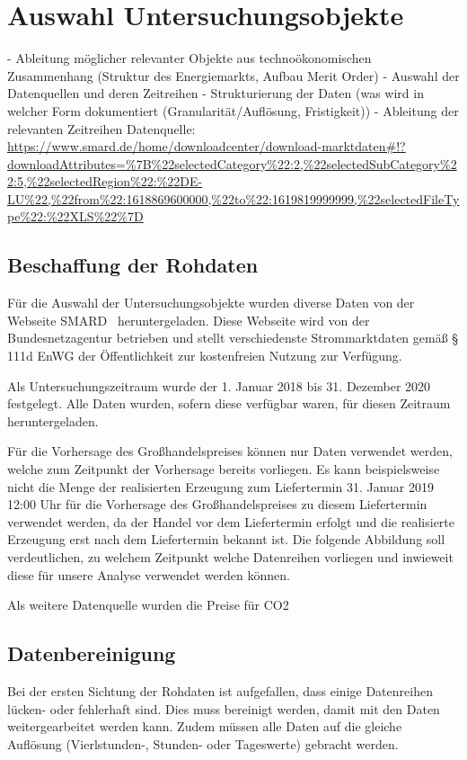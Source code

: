 \section{Auswahl Untersuchungsobjekte}
-	Ableitung möglicher relevanter Objekte aus technoökonomischen Zusammenhang (Struktur des Energiemarkts, Aufbau Merit Order)
-	Auswahl der Datenquellen und deren Zeitreihen
-	Strukturierung der Daten (was wird in welcher Form dokumentiert (Granularität/Auflösung, Fristigkeit))
-	Ableitung der relevanten Zeitreihen
Datenquelle: \url{https://www.smard.de/home/downloadcenter/download-marktdaten#!?downloadAttributes=%7B%22selectedCategory%22:2,%22selectedSubCategory%22:5,%22selectedRegion%22:%22DE-LU%22,%22from%22:1618869600000,%22to%22:1619819999999,%22selectedFileType%22:%22XLS%22%7D}

\subsection{Beschaffung der Rohdaten}
Für die Auswahl der Untersuchungsobjekte wurden diverse Daten von der Webseite SMARD  heruntergeladen. Diese Webseite wird von der Bundesnetzagentur betrieben und stellt verschiedenste Strommarktdaten gemäß § 111d EnWG  der Öffentlichkeit zur kostenfreien Nutzung zur Verfügung.


Als Untersuchungszeitraum wurde der 1. Januar 2018 bis 31. Dezember 2020 festgelegt. Alle Daten wurden, sofern diese verfügbar waren, für diesen Zeitraum heruntergeladen.

Für die Vorhersage des Großhandelspreises können nur Daten verwendet werden, welche zum Zeitpunkt der Vorhersage bereits vorliegen. Es kann beispielsweise nicht die Menge der realisierten Erzeugung zum Liefertermin 31. Januar 2019 12:00 Uhr für die Vorhersage des Großhandelspreises zu diesem Liefertermin verwendet werden, da der Handel vor dem Liefertermin erfolgt und die realisierte Erzeugung erst nach dem Liefertermin bekannt ist. Die folgende Abbildung soll verdeutlichen, zu welchem Zeitpunkt welche Datenreihen vorliegen und inwieweit diese für unsere Analyse verwendet werden können.


Als weitere Datenquelle wurden die Preise für CO2

\subsection{Datenbereinigung}
Bei der ersten Sichtung der Rohdaten ist aufgefallen, dass einige Datenreihen lücken- oder fehlerhaft sind. Dies muss bereinigt werden, damit mit den Daten weitergearbeitet werden kann. Zudem müssen alle Daten auf die gleiche Auflösung (Vierlstunden-, Stunden- oder Tageswerte) gebracht werden.


